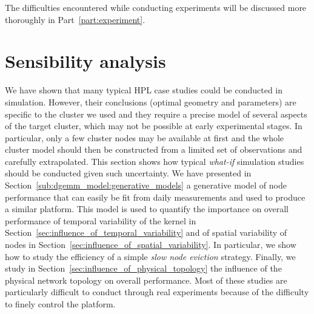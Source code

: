         The difficulties encountered while conducting experiments will be discussed more thoroughly in
        Part~\ref{part:experiment}.

\chapter{Sensibility analysis}%
\label{chapter:prediction:sensibility}



    We have shown that many typical HPL case studies could be conducted in simulation. However, their conclusions
    (optimal geometry and parameters) are specific to the cluster we used and they require a precise model of several
    aspects of the target cluster, which may not be possible at early experimental stages. In particular, only a few
    cluster nodes may be available at first and the whole cluster model should then be constructed from a limited set of
    observations and carefully extrapolated. This section shows how typical \emph{what-if} simulation studies should be
    conducted given such uncertainty. We have presented in Section~\ref{sub:dgemm_model:generative_models} a generative
    model of node performance that can easily be fit from daily measurements and used to produce a similar platform.
    This model is used to quantify the importance on overall performance of temporal variability of the \dgemm kernel in
    Section~\ref{sec:influence_of_temporal_variability} and of spatial variability of nodes in
    Section~\ref{sec:influence_of_spatial_variability}. In particular, we show how to study the efficiency of a simple
    \emph{slow node eviction} strategy. Finally, we study in Section~\ref{sec:influence_of_physical_topology} the
    influence of the physical network topology on overall performance. Most of these studies are particularly difficult
    to conduct through real experiments because of the difficulty to finely control the platform.

